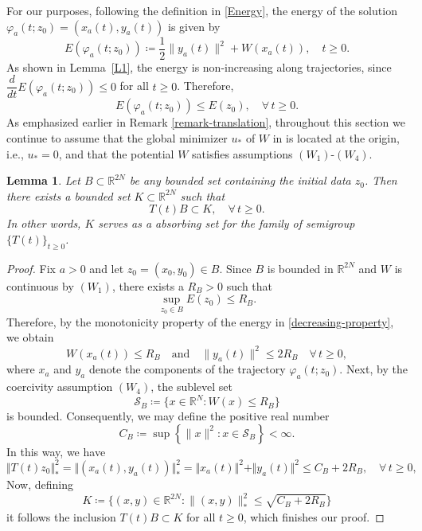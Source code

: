 \documentclass[12pt]{amsart}
\numberwithin{equation}{section}
\newtheorem{lemma}[theorem]{Lemma}
\begin{document}
For our purposes, following the definition in \eqref{Energy}, the energy of the solution $\varphi_a(t;z_0) = (x_a(t),y_a(t))$ is given by
$$
E(\varphi_a(t;z_0)) \coloneqq \frac12 \|y_a(t)\|^2 + W(x_a(t)),\quad t\ge 0.
$$
As shown in Lemma~\ref{L1}, the energy is non-increasing along trajectories, since $\dfrac{d}{dt} E(\varphi_a(t;z_0)) \le 0$ for all $t\ge 0$. Therefore,
\begin{equation}\label{decreasing-property}
	E(\varphi_a(t;z_0))\le E(z_0),\quad \forall\, t\ge 0.
\end{equation}
As emphasized earlier in Remark \ref{remark-translation}, throughout this section we continue to assume that the global minimizer $u_*$ of $W$ in is located at the origin, i.e., $u_*=0$, and that the potential $W$ satisfies assumptions \hyperlink{W1}{$(W_1)$}-\hyperlink{W4}{$(W_4)$}.

\begin{lemma}\label{asd}
	Let $B\subset \mathbb R^{2N}$ be any bounded set containing the initial data $z_0$.
	Then there exists a bounded set $K\subset \mathbb{R}^{2N}$ such that 
	$$
	T(t) B \subset K,\quad \forall\, t\ge 0.
	$$
	In other words, $K$ serves as a absorbing set for the family of semigroup $\{T(t)\}_{t\ge 0}$.
\end{lemma}
\begin{proof}
Fix $a>0$ and let $z_0=(x_0,y_0)\in B$. Since $B$ is bounded in $\mathbb{R}^{2N}$ and $W$ is continuous by \hyperlink{W1}{$(W_1)$}, there exists a $R_B>0$ such that
$$
\sup_{z_0\in B} E(z_0)\le R_B.
$$
Therefore, by the monotonicity property of the energy in \eqref{decreasing-property}, we obtain
$$
W(x_a(t))\leq R_B\quad\text{and}\quad\|y_a(t)\|^2\leq 2R_B\quad\forall \, t\geq 0,
$$
where $x_a$ and $y_a$ denote the components of the trajectory $\varphi_a(t;z_0)$. Next, by the coercivity assumption \hyperlink{W4}{$(W_4)$}, the sublevel set
$$
\mathcal{S}_{B} \coloneqq \{ x \in \mathbb{R}^{N}:W(x)\le R_B\}
$$
is bounded. Consequently, we may define the positive real number
$$
C_B \coloneqq \sup \left\{\|x\|^{2} : x \in \mathcal{S}_{B}\right\} < \infty.
$$
In this way, we have 
$$
\Vert T(t)z_0 \Vert_{\ast}^2 = \Vert (x_a(t), y_a(t))\Vert_{\ast}^2 = \Vert x_a(t) \Vert^2 + \Vert y_a(t) \Vert^2 \leq C_B + 2R_B,\quad \forall\, t\ge 0, 
$$
Now, defining
$$
K\coloneqq\Big\{(x,y)\in\mathbb{R}^{2N}:\|(x,y)\|_{\ast}^{2}\le \sqrt{C_B + 2R_B}\Big\}
$$
it follows the inclusion $T(t)B \subset K$ for all $t\geq 0$, which finishes our proof.
\end{proof}
\end{document}
